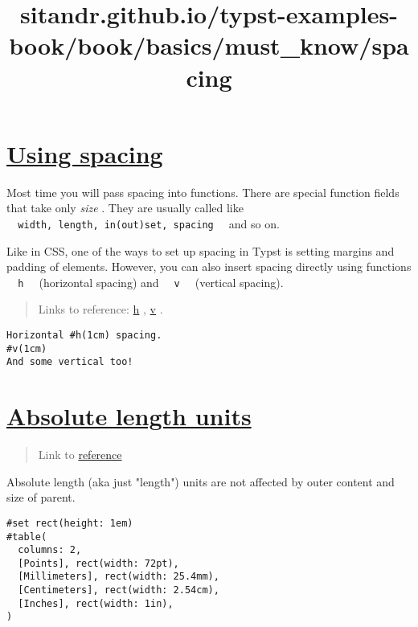 \title{sitandr.github.io/typst-examples-book/book/basics/must_know/spacing}

\section{\texorpdfstring{\hyperref[using-spacing]{Using
spacing}}{Using spacing}}\label{using-spacing}

Most time you will pass spacing into functions. There are special
function fields that take only \emph{size} . They are usually called
like
\texttt{\ }{\texttt{\ width,\ length,\ in(out)set,\ spacing\ }}\texttt{\ }
and so on.

Like in CSS, one of the ways to set up spacing in Typst is setting
margins and padding of elements. However, you can also insert spacing
directly using functions \texttt{\ }{\texttt{\ h\ }}\texttt{\ }
(horizontal spacing) and \texttt{\ }{\texttt{\ v\ }}\texttt{\ }
(vertical spacing).

\begin{quote}
Links to reference: \href{https://typst.app/docs/reference/layout/h/}{h}
, \href{https://typst.app/docs/reference/layout/v/}{v} .
\end{quote}

\begin{verbatim}
Horizontal #h(1cm) spacing.
#v(1cm)
And some vertical too!
\end{verbatim}

\pandocbounded{}

\section{\texorpdfstring{\hyperref[absolute-length-units]{Absolute
length units}}{Absolute length units}}\label{absolute-length-units}

\begin{quote}
Link to
\href{https://typst.app/docs/reference/layout/length/}{reference}
\end{quote}

Absolute length (aka just "length") units are not affected by outer
content and size of parent.

\begin{verbatim}
#set rect(height: 1em)
#table(
  columns: 2,
  [Points], rect(width: 72pt),
  [Millimeters], rect(width: 25.4mm),
  [Centimeters], rect(width: 2.54cm),
  [Inches], rect(width: 1in),
)
\end{verbatim}


